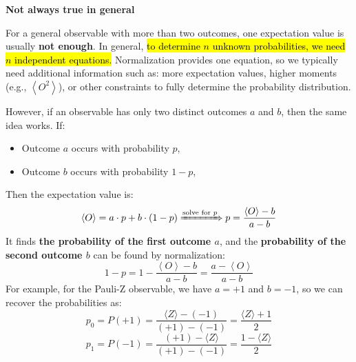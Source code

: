 \highspace
\begin{flushleft}
    \textcolor{Red2}{ \textbf{Not always true in general}}
\end{flushleft}
For a general observable with more than two outcomes, one expectation value is usually \textbf{not enough}. In general, \hl{to determine $n$ unknown probabilities, we need $n$ independent equations.} Normalization provides one equation, so we typically need additional information such as: more expectation values, higher moments (e.g., $\left\langle O^2 \right\rangle$), or other constraints to fully determine the probability distribution.

\highspace
However, if an observable has only two distinct outcomes $a$ and $b$, then the same idea works. If:
\begin{itemize}
    \item Outcome $a$ occurs with probability $p$,
    \item Outcome $b$ occurs with probability $1-p$,
\end{itemize}
Then the expectation value is:
\begin{equation}
    \left\langle O \right\rangle
    =
    a \cdot p + b \cdot (1-p)
    \xRightarrow{\text{solve for } p}
    p
    =
    \frac{\left\langle O \right\rangle - b}{a - b}
\end{equation}
It finds \textbf{the probability of the first outcome $a$}, and the \textbf{probability of the second outcome $b$} can be found by normalization:
\begin{equation}
    1 - p
    =
    1 - \frac{\left\langle O \right\rangle - b}{a - b}
    =
    \frac{a - \left\langle O \right\rangle}{a - b}
\end{equation}
For example, for the Pauli-Z observable, we have $a = +1$ and $b = -1$, so we can recover the probabilities as:
\begin{equation*}
    p_0 = P(+1) = \frac{\langle Z \rangle - (-1)}{(+1) - (-1)} = \frac{\langle Z \rangle + 1}{2}
\end{equation*}
\begin{equation*}
    p_1 = P(-1) = \frac{(+1) - \langle Z \rangle}{(+1) - (-1)} = \frac{1 - \langle Z \rangle}{2}
\end{equation*}